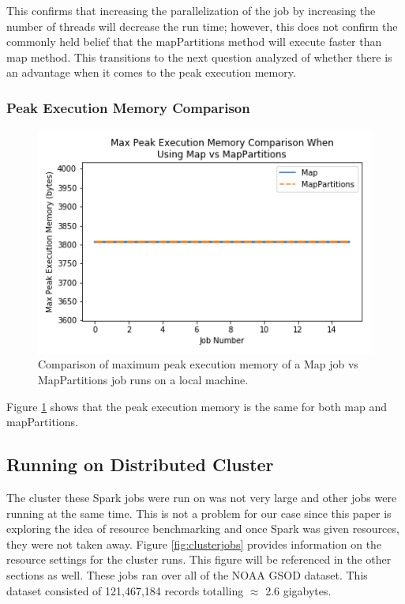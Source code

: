 \documentclass[conference]{IEEEtran}
\begin{document}
This confirms that increasing the parallelization of the job by increasing the number of threads will decrease the run time;
however, this does not confirm the commonly held belief that the mapPartitions method will execute faster than map method.
This transitions to the next question analyzed of whether there is an advantage when it comes to the peak execution memory.

\subsubsection{Peak Execution Memory Comparison}
\begin{figure}
    \includegraphics[width=\linewidth]{../python_scripts/images/mapVsMapPartitionsMaxPeakExecutionMemory.png}
    \caption{Comparison of maximum peak execution memory of a Map job vs MapPartitions job runs on a local machine.}
    \label{fig:mapVMapPartitionsMaxPeakExecutionMemory}
\end{figure}

Figure \ref{fig:mapVMapPartitionsMaxPeakExecutionMemory} shows that the peak execution memory is the same for both map and mapPartitions.

\subsection{Running on Distributed Cluster}
The cluster these Spark jobs were run on was not very large and other jobs were running at the same time.
This is not a problem for our case since this paper is exploring the idea of resource benchmarking and once Spark was given resources, they were not taken away.
Figure \ref{fig:clusterjobs} provides information on the resource settings for the cluster runs.
This figure will be referenced in the other sections as well.
These jobs ran over all of the NOAA GSOD dataset.
This dataset consisted of 121,467,184 records totalling $\approx$ 2.6 gigabytes.
\end{document}
